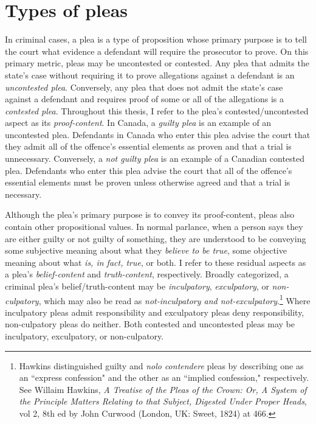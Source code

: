 \section{Types of pleas}

In criminal cases, a plea is a type of proposition whose primary purpose is to tell the court what evidence a defendant will require the prosecutor to prove. On this primary metric, pleas may be uncontested or contested. Any plea that admits the state's case without requiring it to prove allegations against a defendant is an \textit{uncontested plea}. Conversely, any plea that does not admit the state's case against a defendant and requires proof of some or all of the allegations is a \textit{contested plea}. Throughout this thesis, I refer to the plea's contested/uncontested aspect as its \textit{proof-content}. In Canada, a \textit{guilty plea} is an example of an uncontested plea. Defendants in Canada who enter this plea advise the court that they admit all of the offence's essential elements as proven and that a trial is unnecessary. Conversely, a \textit{not guilty plea} is an example of a Canadian contested plea. Defendants who enter this plea advise the court that all of the offence's essential elements must be proven unless otherwise agreed and that a trial is necessary.

Although the plea's primary purpose is to convey its proof-content, pleas also contain other propositional values. In normal parlance, when a person says they are either guilty or not guilty of something, they are understood to be conveying some subjective meaning about what they \textit{believe to be true}, some objective meaning about what \textit{is, in fact, true}, or both. I refer to these residual aspects as a plea's \textit{belief-content} and \textit{truth-content}, respectively. Broadly categorized, a criminal plea's belief/truth-content may be \textit{inculpatory}, \textit{exculpatory}, or \textit{non-culpatory}, which may also be read as \textit{not-inculpatory and not-exculpatory}.\footnote{Hawkins distinguished guilty and \textit{nolo contendere} pleas by describing one as an ``express confession" and the other as an ``implied confession," respectively. See Willaim Hawkins, \textit{A Treatise of the Pleas of the Crown: Or, A System of the Principle Matters Relating to that Subject, Digested Under Proper Heads}, vol 2, 8th ed by John Curwood (London, UK: Sweet, 1824) at 466.} Where inculpatory pleas admit responsibility and exculpatory pleas deny responsibility, non-culpatory pleas do neither. Both contested and uncontested pleas may be inculpatory, exculpatory, or non-culpatory.

